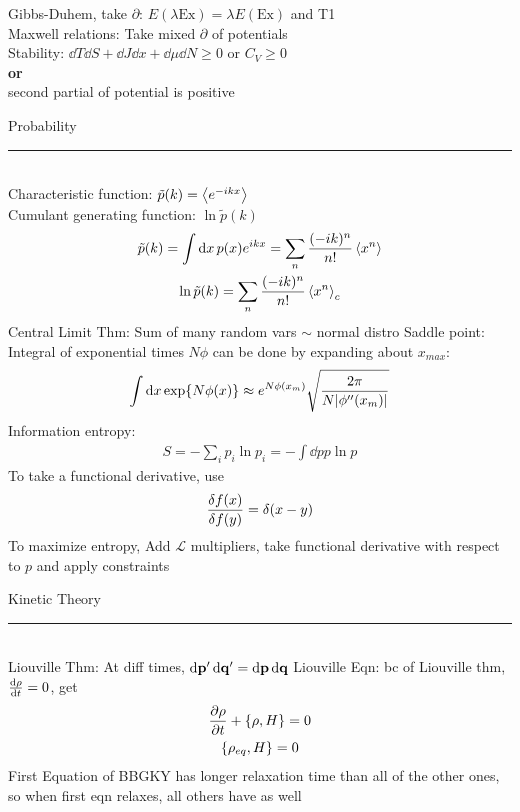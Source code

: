 \documentclass[8pt]{article}
\begin{document}
\begin{multicols*}{2}
   Gibbs-Duhem, take $\partial$: $E(\lambda\text{Ex})=\lambda E(\text{Ex})$ and T1\\
   Maxwell relations: Take mixed $\partial$ of potentials\\
   Stability: $\dd{T}\dd{S}+\dd{J}\dd{x}+\dd{\mu}\dd{N}\geq 0$ or $C_V\geq0$
   \\\textbf{or}\\ second partial of potential is positive
  \begin{center}
    \normalsize{Probability}
  \end{center}
    \hrule~\\
  Characteristic function: $\tilde{p}(k)=\ev{e^{-ikx}}$ \\
  Cumulant generating function: $\ln\tilde{p}(k)$
  \begin{gather*}
    \tilde{p}(k)=\int\dd{x}p(x)e^{ikx}=\sum_{n}\frac{(-ik)^n}{n!}\ev{x^n}\\
    \ln\tilde{p}(k)=\sum_n\frac{(-ik)^n}{n!}\ev{x^n}_c
  \end{gather*}
  Central Limit Thm: Sum of many random vars $\sim$ normal distro
  Saddle point: Integral of exponential times $N\phi$ can be done by expanding about $x_{max}$:
  \begin{align*}
    \int\dd{x}\exp{N\phi(x)}\approx e^{N\phi(x_{m})}
    \sqrt{\frac{2\pi}{N\abs{\phi''(x_{m})}}}
  \end{align*}
  Information entropy:
  \begin{align*}
    S=-\sum_ip_i\ln p_i=-\int\dd{p}p\ln p
  \end{align*}
  To take a functional derivative, use
  \begin{gather*}
    \fdv{f(x)}{f(y)}=\delta(x-y)
  \end{gather*}
  To maximize entropy, Add $\mathcal{L}$ multipliers, take functional derivative with respect to $p$ and apply constraints
  \begin{center}
    \normalsize{Kinetic Theory}
  \end{center}
    \hrule~\\
  Liouville Thm: At diff times, $\dd{\vb{p}'}\dd{\vb{q}'}=\dd{\vb{p}}\dd{\vb{q}}$
  Liouville Eqn: bc of Liouville thm, $\dv{\rho}{t}=0$, get
  \begin{gather*}
    \pdv{\rho}{t}+\{\rho,H\}=0\\
    \{\rho_{eq},H\}=0
  \end{gather*}
  First Equation of BBGKY has longer relaxation time than all of the other ones, so when first eqn relaxes, all others have as well\\

\end{multicols*}
\end{document}
